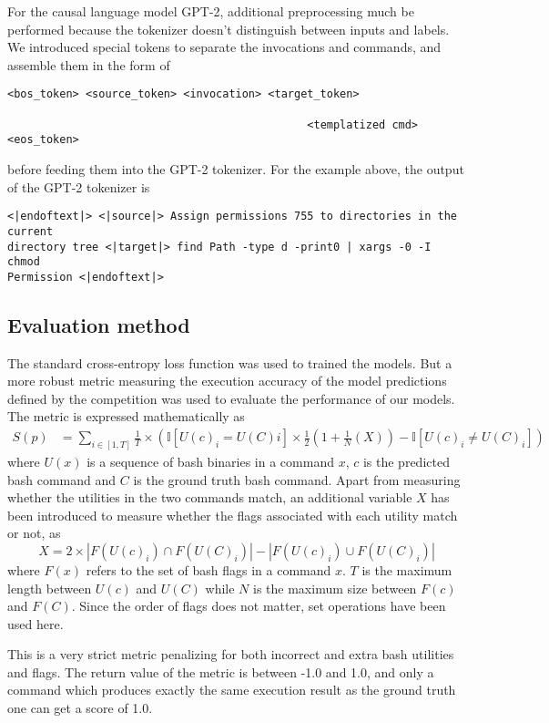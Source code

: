 For the causal language model GPT-2, additional preprocessing much be
performed because the tokenizer doesn't distinguish between inputs and labels. We introduced special tokens to separate the invocations and
commands, and assemble them in the form of

\begin{verbatim}
<bos_token> <source_token> <invocation> <target_token>

                                              <templatized cmd> <eos_token> 
\end{verbatim}
before feeding them into the GPT-2 tokenizer. For the example above, the output of the GPT-2 tokenizer is
\begin{verbatim}
<|endoftext|> <|source|> Assign permissions 755 to directories in the current
directory tree <|target|> find Path -type d -print0 | xargs -0 -I chmod 
Permission <|endoftext|>

\end{verbatim}


\subsection{Evaluation method}
The standard cross-entropy loss function was used to trained the models. But a more robust metric measuring the execution accuracy of the model predictions defined by the competition was used to evaluate the performance of our models. The metric is expressed mathematically as
\begin{align*}
	S(p) & =\sum_{i\in[1,T]}\frac{1}{T}\times\left(
	\mathbb{I}[U(c)_i=U(C)i]\times\frac{1}{2}\left(
		1+\frac{1}{N}\left(X\right)\right) -\mathbb{I}[U(c)_i\ne U(C)_i]
	\right)
\end{align*}
where $U(x)$ is a sequence of bash binaries in a command $x$, $c$ is the
predicted bash command and $C$ is the ground truth bash command.
Apart from measuring whether the utilities in the two commands match, an additional variable $X$ has been introduced to measure whether the flags associated with each utility match or not, as
\begin{equation*}
	X = 2\times
	|F(U(c)_i)\cap F(U(C)_i)| - |F(U(c)_i)\cup F(U(C)_i)|
\end{equation*}
where $F(x)$ refers to
the set of bash flags in a command $x$. $T$ is the maximum length between
$U(c)$ and $U(C)$ while $N$ is the maximum size between $F(c)$ and $F(C)$. Since the order of flags does not matter, set operations have been used here.

This is a very strict metric penalizing for both incorrect and extra bash utilities and flags. The return value of the metric is between -1.0 and 1.0, and only a command which produces exactly the same execution result as the ground truth one can get a score of 1.0.